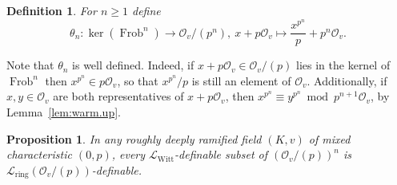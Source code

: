 \documentclass[a4paper]{amsart}
\theoremstyle{mystyle2}
\newtheorem{prop}[thm]{Proposition}
\theoremstyle{mystyle}
\newtheorem{defi}[thm]{Definition}
\DeclareMathOperator{\Frob}{Frob}
\renewcommand{\L}{\mathcal{L}}
\newcommand{\Lring}{\L_{\mathrm{ring}}}
\newcommand{\LWitt}{\L_{\mathrm{Witt}}}
\renewcommand{\O}{\mathcal{O}}
\numberwithin{equation}{section}
\begin{document}
    \begin{defi}
        For $n\geq 1$ define
        \[
        \theta_n\colon \ker(\Frob^{n})\to \O_v/(p^{n}),\ x + p\O_v\mapsto \frac{x^{p^{n}}}{p} + p^{n}\O_v.
        \]
    \end{defi}
    
    Note that $\theta_n$ is well defined.
    Indeed, if $x+p\O_v\in \O_v/(p)$ lies in the kernel of $\Frob^{n}$ then $x^{p^{n}} \in p\O_v$, so that $x^{p^{n}}/p$ is still an element of $\O_v$.
    Additionally, if $x,y\in \O_v$ are both representatives of $x+p\O_v$, then $x^{p^{n}} \equiv y^{p^{n}}\bmod p^{n+1}\O_v$, by Lemma~\ref{lem:warm.up}.
    
    \begin{prop} \label{prop:ring}
        In any roughly deeply ramified field $(K,v)$ of mixed characteristic $(0,p)$, 
        every $\LWitt$-definable subset of $(\O_v/(p))^n$ is $\Lring(\O_v/(p))$-definable.
    \end{prop}
\end{document}
